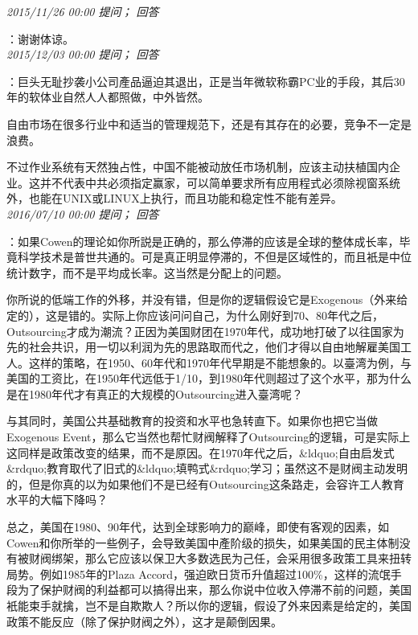 \documentclass[twocolumn]{ctexart}
\begin{document}
\textit{\hfill\noindent\small 2015/11/26 00:00 提问； 回答}

：谢谢体谅。\\

\textit{\hfill\noindent\small 2015/12/03 00:00 提问； 回答}

：巨头无耻抄袭小公司產品逼迫其退出，正是当年微软称霸PC业的手段，其后30年的软体业自然人人都照做，中外皆然。

自由市场在很多行业中和适当的管理规范下，还是有其存在的必要，竞争不一定是浪费。

不过作业系统有天然独占性，中国不能被动放任市场机制，应该主动扶植国内企业。这并不代表中共必须指定赢家，可以简单要求所有应用程式必须除视窗系统外，也能在UNIX或LINUX上执行，而且功能和稳定性不能有差异。\\

\textit{\hfill\noindent\small 2016/07/10 00:00 提问； 回答}

：如果Cowen的理论如你所説是正确的，那么停滞的应该是全球的整体成长率，毕竟科学技术是普世共通的。可是真正明显停滞的，不但是区域性的，而且衹是中位统计数字，而不是平均成长率。这当然是分配上的问题。

你所说的低端工作的外移，并没有错，但是你的逻辑假设它是Exogenous（外来给定的），这是错的。实际上你应该问问自己，为什么刚好到70、80年代之后，Outsourcing才成为潮流？正因为美国财团在1970年代，成功地打破了以往国家为先的社会共识，用一切以利润为先的思路取而代之，他们才得以自由地解雇美国工人。这样的策略，在1950、60年代和1970年代早期是不能想象的。以臺湾为例，与美国的工资比，在1950年代远低于1/10，到1980年代则超过了这个水平，那为什么是在1980年代才有真正的大规模的Outsourcing进入臺湾呢？

与其同时，美国公共基础教育的投资和水平也急转直下。如果你也把它当做Exogenous Event，那么它当然也帮忙财阀解释了Outsourcing的逻辑，可是实际上这同样是政策改变的结果，而不是原因。在1970年代之后，\&ldquo;自由启发式\&rdquo;教育取代了旧式的\&ldquo;填鸭式\&rdquo;学习；虽然这不是财阀主动发明的，但是你真的以为如果他们不是已经有Outsourcing这条路走，会容许工人教育水平的大幅下降吗？

总之，美国在1980、90年代，达到全球影响力的巅峰，即使有客观的因素，如Cowen和你所举的一些例子，会导致美国中產阶级的损失，如果美国的民主体制没有被财阀绑架，那么它应该以保卫大多数选民为己任，会采用很多政策工具来扭转局势。例如1985年的Plaza Accord，强迫欧日货币升值超过100\%，这样的流氓手段为了保护财阀的利益都可以搞得出来，那么你说中位收入停滞不前的问题，美国衹能束手就擒，岂不是自欺欺人？所以你的逻辑，假设了外来因素是给定的，美国政策不能反应（除了保护财阀之外），这才是颠倒因果。\\
\end{document}
